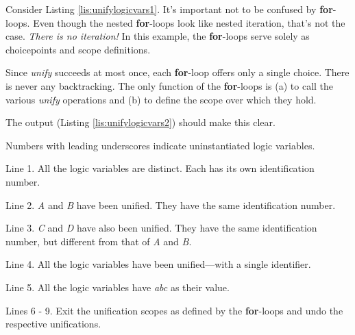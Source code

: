 Consider Listing \ref{lis:unifylogicvars1}. It's important not to be confused by \textbf{for}-loops. Even though the nested \textbf{for}-loops look like nested iteration, that's not the case. \textit{There is no iteration!} In this example, the \textbf{for}-loops serve solely as choicepoints and scope definitions. 

 Since  \textit{unify} succeeds at most once, each \textbf{for}-loop offers only a single choice. There is never any backtracking. The only function of the \textbf{for}-loops is (a) to call the various \textit{unify} operations and (b) to define the scope over which they hold.  
 
 The output (Listing \ref{lis:unifylogicvars2}) should make this clear. 


Numbers with leading underscores indicate uninstantiated logic variables. 

Line 1. All the logic variables are distinct. Each has its own identification number.

Line 2. \textit{A} and \textit{B} have been unified. They have the same identification number.

Line 3. \textit{C} and \textit{D} have also been unified. They have the same identification number, but different from that of \textit{A} and \textit{B}.

Line 4. All the logic variables have been unified---with a single identifier.

Line 5. All the logic variables have \textit{abc} as their value.

Lines 6 - 9. Exit the unification scopes as defined by the \textbf{for}-loops and undo the respective unifications.

